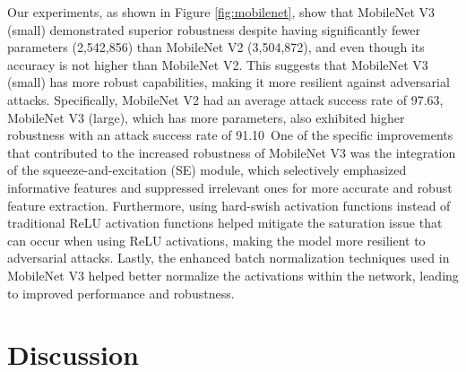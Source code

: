 Our experiments, as shown in Figure \ref{fig:mobilenet}, show that MobileNet V3 (small) demonstrated superior robustness despite having significantly fewer parameters (2,542,856) than MobileNet V2 (3,504,872), and even though its accuracy is not higher than MobileNet V2. 
This suggests that MobileNet V3 (small) has more robust capabilities, making it more resilient against adversarial attacks. 
Specifically, MobileNet V2 had an average attack success rate of 97.63\Moreover, MobileNet V3 (large), which has more parameters, also exhibited higher robustness with an attack success rate of 91.10\
One of the specific improvements that contributed to the increased robustness of MobileNet V3 was the integration of the squeeze-and-excitation (SE) module, which selectively emphasized informative features and suppressed irrelevant ones for more accurate and robust feature extraction. Furthermore, using hard-swish activation functions instead of traditional ReLU activation functions helped mitigate the saturation issue that can occur when using ReLU activations, making the model more resilient to adversarial attacks. 
Lastly, the enhanced batch normalization techniques used in MobileNet V3 helped better normalize the activations within the network, leading to improved performance and robustness.



\section{Discussion}
\label{sec:discussion}

